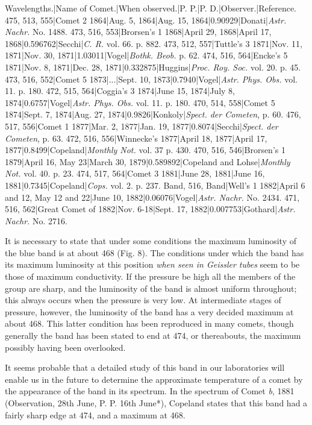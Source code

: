 \documentclass[a4paper, 12pt, oneside, polutonikogreek, english]{article}
\begin{document}
Wavelengths.|Name of Comet.|When observed.|P. P.|P. D.|Observer.|Reference. 
475, 513, 555|Comet 2 1864|Aug. 5, 1864|Aug. 15, 1864|0.90929|Donati|\emph{Astr. Nachr.} No. 1488. 
473, 516, 553|Brorsen's 1 1868|April 29, 1868|April 17, 1868|0.596762|Secchi|\emph{C. R.} vol. 66. p. 882. 
473, 512, 557|Tuttle's 3 1871|Nov. 11, 1871|Nov. 30, 1871|1.03011|Vogel|\emph{Bothk. Beob.} p. 62. 
474, 516, 564|Encke's 5 1871|Nov. 8, 1871|Dec. 28, 1871|0.332875|Huggins|\emph{Proc. Roy. Soc.} vol. 20. p. 45. 
473, 516, 552|Comet 5 1873|...|Sept. 10, 1873|0.7940|Vogel|\emph{Astr. Phys. Obs.} vol. 11. p. 180. 
472, 515, 564|Coggia's 3 1874|June 15, 1874|July 8, 1874|0.6757|Vogel|\emph{Astr. Phys. Obs.} vol. 11. p. 180. 
470, 514, 558|Comet 5 1874|Sept. 7, 1874|Aug. 27, 1874|0.9826|Konkoly|\emph{Spect. der Cometen}, p. 60. 
476, 517, 556|Comet 1 1877|Mar. 2, 1877|Jan. 19, 1877|0.8074|Secchi|\emph{Spect. der Cometen}, p. 63. 
472, 516, 556|Winnecke's 1877|April 18, 1877|April 17, 1877|0.8499|Copeland|\emph{Monthly Not.} vol. 37 p. 430. 
470, 516, 546|Brorsen's 1 1879|April 16, May 23|March 30, 1879|0.589892|Copeland and Lohse|\emph{Monthly Not.} vol. 40. p. 23. 
474, 517, 564|Comet 3 1881|June 28, 1881|June 16, 1881|0.7345|Copeland|\emph{Cops.} vol. 2. p. 237. 
Band, 516, Band|Well's 1 1882|April 6 and 12, May 12 and 22|June 10, 1882|0.06076|Vogel|\emph{Astr. Nachr.} No. 2434. 
471, 516, 562|Great Comet of 1882|Nov. 6-18|Sept. 17, 1882|0.007753|Gothard|\emph{Astr. Nachr.} No. 2716. 

It is necessary to state that under some conditions the maximum luminosity of the blue band is at about 468 (Fig. 8). The conditions under which the band has its maximum luminosity at this position \emph{when seen in Geissler tubes} seem to be those of maximum conductivity. If the pressure be high all the members of the group are sharp, and the luminosity of the band is almost uniform throughout; this always occurs when the pressure is very low. At intermediate stages of pressure, however, the luminosity of the band has a very decided maximum at about 468. This latter condition has been reproduced in many comets, though generally the band has been stated to end at 474, or thereabouts, the maximum possibly having been overlooked.

It seems probable that a detailed study of this band in our laboratories will enable us in the future to determine the approximate temperature of a comet by the appearance of the band in its spectrum. In the spectrum of Comet \emph{b}, 1881 (Observation, 28th June, P. P. 16th June*), Copeland states that this band had a fairly sharp edge at 474, and a maximum at 468.
\end{document}
